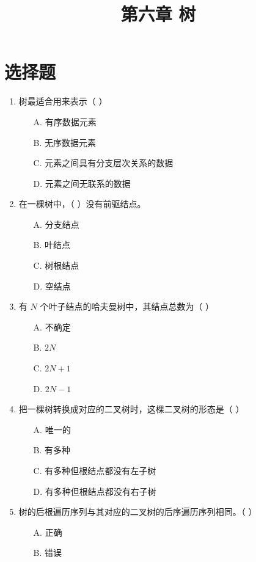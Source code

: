 \documentclass[12pt, a4paper]{article}
\title{\textbf{第六章 树}}
\author{}
\date{}
\begin{document}
\section*{选择题}

\begin{enumerate}[label=\arabic*.]
	\item 树最适合用来表示（ ）
	      \begin{enumerate}
		      \item[A.] 有序数据元素
		      \item[B.] 无序数据元素
		      \item[C.] 元素之间具有分支层次关系的数据
		      \item[D.] 元素之间无联系的数据
	      \end{enumerate}

	\item 在一棵树中，（ ）没有前驱结点。
	      \begin{enumerate}
		      \item[A.] 分支结点
		      \item[B.] 叶结点
		      \item[C.] 树根结点
		      \item[D.] 空结点
	      \end{enumerate}

	\item 有 $N$ 个叶子结点的哈夫曼树中，其结点总数为（ ）
	      \begin{enumerate}
		      \item[A.] 不确定
		      \item[B.] $2N$
		      \item[C.] $2N+1$
		      \item[D.] $2N-1$
	      \end{enumerate}

	\item 把一棵树转换成对应的二叉树时，这棵二叉树的形态是（ ）
	      \begin{enumerate}
		      \item[A.] 唯一的
		      \item[B.] 有多种
		      \item[C.] 有多种但根结点都没有左子树
		      \item[D.] 有多种但根结点都没有右子树
	      \end{enumerate}

	\item 树的后根遍历序列与其对应的二叉树的后序遍历序列相同。（ ）
	      \begin{enumerate}
		      \item[A.] 正确
		      \item[B.] 错误
	      \end{enumerate}


\end{enumerate}
\end{document}
